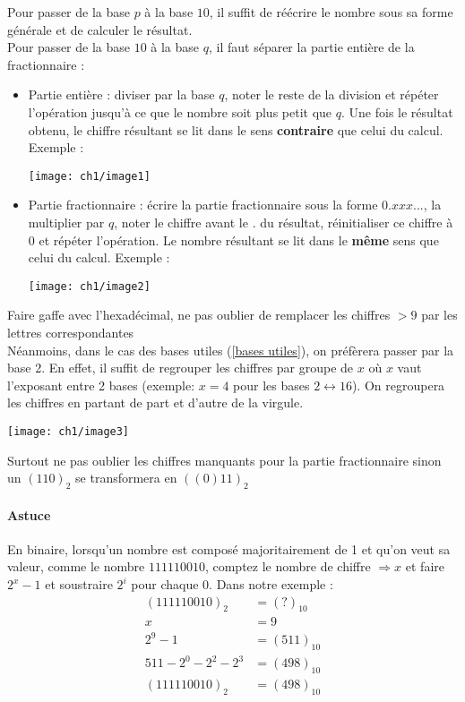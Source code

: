 Pour passer de la base $p$ à la base $10$, il suffit de réécrire le nombre sous sa forme générale et de calculer le résultat. \\
Pour passer de la base $10$ à la base $q$, il faut séparer la partie entière de la fractionnaire :
\begin{itemize}
	\item Partie entière : diviser par la base $q$, noter le reste de la division et répéter l'opération jusqu'à ce que le nombre soit plus petit que $q$. Une fois le résultat obtenu, le chiffre résultant se lit dans le sens \textbf{contraire} que celui du calcul. Exemple :
	\begin{center}
		\texttt{[image: ch1/image1]}
	\end{center}
	\item Partie fractionnaire : écrire la partie fractionnaire sous la forme $0.xxx...$, la multiplier par $q$, noter le chiffre avant le $.$ du résultat, réinitialiser ce chiffre à $0$ et répéter l'opération. Le nombre résultant se lit dans le \textbf{même} sens que celui du calcul. Exemple :
	\begin{center}
		\texttt{[image: ch1/image2]}
	\end{center}
\end{itemize}
\danger Faire gaffe avec l'hexadécimal, ne pas oublier de remplacer les chiffres $>9$ par les lettres correspondantes\\

Néanmoins, dans le cas des bases utiles (\autoref{bases utiles}), on préfèrera passer par la base 2. En effet, il suffit de regrouper les chiffres par groupe de $x$ où $x$ vaut l'exposant entre 2 bases (exemple: $x=4$ pour les bases $2\leftrightarrow 16$). On regroupera les chiffres en partant de part et d'autre de la virgule.
\begin{center}
	\texttt{[image: ch1/image3]}
\end{center}
\danger Surtout ne pas oublier les chiffres manquants pour la partie fractionnaire sinon un $(110)_2$ se transformera en $((0)11)_2$
\paragraph{Astuce} En binaire, lorsqu'un nombre est composé majoritairement de 1 et qu'on veut sa valeur, comme le nombre $111110010$, comptez le nombre de chiffre $\Rightarrow x$ et faire $2^x-1$ et soustraire $2^i$ pour chaque 0. Dans notre exemple :
\begin{align}
	(111110010)_2 &=(?)_{10}\\
	x &=9\\
	2^9-1 &=(511)_{10}\\
	511-2^0-2^2-2^3 &=(498)_{10}\\
	(111110010)_2 &=(498)_{10}
\end{align}
